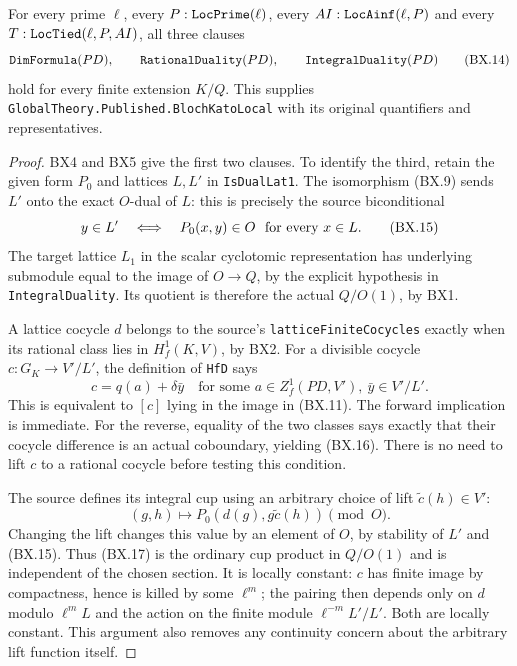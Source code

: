 \begin{theorem}
\label{claim:BX7}
For every prime $\ell$, every $P:\texttt{Loc\allowbreak Prime}(\ell)$,
every $AI:\texttt{Loc\allowbreak Ainf}(\ell,P)$ and every
$T:\texttt{Loc\allowbreak Tied}(\ell,P,AI)$, all three clauses
\[
 \texttt{Dim\allowbreak Formula}(PD),\qquad
 \texttt{Rational\allowbreak Duality}(PD),\qquad
 \texttt{Integral\allowbreak Duality}(PD)
                                                               \tag{BX.14}
\]
hold for every finite extension $K/Q$.
This supplies \texttt{Global\allowbreak Theory.\allowbreak Published.\allowbreak Bloch\allowbreak Kato\allowbreak Local}
with its original quantifiers and representatives.
\end{theorem}
\begin{proof}
BX4 and BX5 give the first two clauses.  To identify the
third, retain the given form $P_0$ and lattices $L,L'$ in
\texttt{Is\allowbreak Dual\allowbreak Lat1}.  The isomorphism (BX.9) sends $L'$
onto the exact $O$-dual of $L$: this is precisely the
source biconditional
\[
 y\in L'
   \quad\Longleftrightarrow\quad
    P_0(x,y)\in O\ \hbox{ for every }x\in L.                   \tag{BX.15}
\]
The target lattice $L_1$ in the scalar cyclotomic
representation has underlying submodule equal to the
image of $O\to Q$, by the explicit hypothesis in
\texttt{Integral\allowbreak Duality}.  Its quotient is therefore
the actual $Q/O(1)$, by BX1.

A lattice cocycle $d$ belongs to the source's
\texttt{lattice\allowbreak Finite\allowbreak Cocycles} exactly when its rational
class lies in $H_f^1(K,V)$, by BX2.
For a divisible cocycle $c:G_K\to V'/L'$, the definition
of \texttt{Hf\allowbreak D} says
\[
             c=q(a)+\delta\bar y
       \quad\text{for some }a\in Z_f^1(PD,V'),\
                                \bar y\in V'/L'.              \tag{BX.16}
\]
This is equivalent to $[c]$ lying in the image in (BX.11).
The forward implication is immediate.  For the reverse,
equality of the two classes says exactly that their
cocycle difference is an actual coboundary, yielding
(BX.16).  There is no need to lift $c$ to a rational
cocycle before testing this condition.

The source defines its integral cup using an arbitrary
choice of lift $\widetilde c(h)\in V'$:
\[
       (g,h)\longmapsto P_0(d(g),g\widetilde c(h))
                                  \pmod O.                    \tag{BX.17}
\]
Changing the lift changes this value by an element of $O$,
by stability of $L'$ and (BX.15).  Thus (BX.17) is the
ordinary cup product in $Q/O(1)$ and is independent of
the chosen section.  It is locally constant:
$c$ has finite image by compactness, hence is killed
by some $\ell^m$; the pairing then depends only on
$d$ modulo $\ell^mL$ and the action on the finite
module $\ell^{-m}L'/L'$.  Both are locally constant.
This argument also removes any continuity concern about
the arbitrary lift function itself.


\end{proof}
